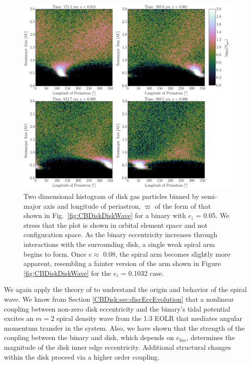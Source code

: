 \begin{figure}
	\includegraphics[width=\textwidth]{f6.pdf} %
    \caption{Two dimensional histogram of disk gas particles binned by semi-major axis and
longitude of periastron, $\varpi$ of the form of that shown in Fig.~\ref{fig:CBDiskDiskWave} for a binary with $e_i$ = 0.05.  We stress that the plot is shown in orbital 
element space and not configuration space.  As the binary eccentricity increases through 
interactions with the surrounding disk, a single weak spiral arm begins to form.  Once $e \approx$ 0.08, the spiral arm becomes slightly more apparent, 
resembling a fainter version of the arm shown in Figure \ref{fig:CBDiskDiskWave} for the $e_i$ = 0.1032 case.}
    \label{fig:CBDiskStruct}
\end{figure}

We again apply the theory of \citet{Papaloizou2001} to understand the origin and behavior of the spiral wave.  We know from Section \ref{CBDisk:sec:discEccEvolution} that a nonlinear coupling between non-zero disk eccentricity and the binary's tidal potential excites an $m = 2$ spiral density wave from the 1:3 EOLR that mediates angular momentum transfer in the system.  Also, we have shown that the strength of the coupling between the binary and disk, which depends on $e_{bin}$, determines the magnitude of the disk inner edge eccentricity.  Additional structural changes within the disk proceed via a higher order coupling.  

